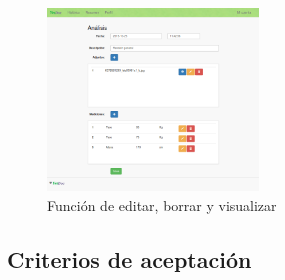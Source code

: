    \begin{figure}[h]
        \centering
        \includegraphics[width=0.5\textwidth]{img/5-mediciones_cargadas}
        \caption{Función de editar, borrar y visualizar}
		\label{5-mediciones_cargadas}
    \end{figure}


\clearpage

\subsection{Criterios de aceptación}

